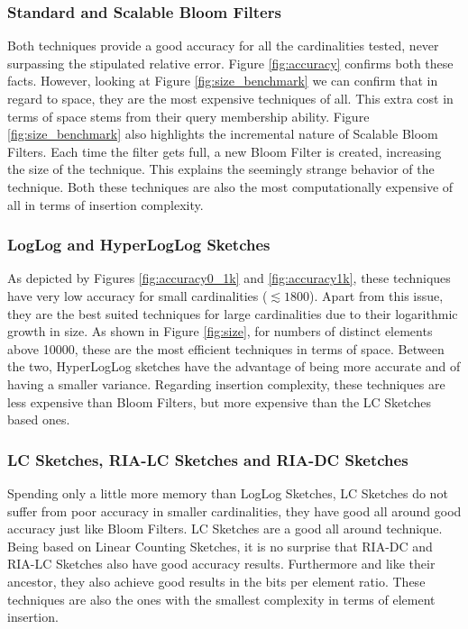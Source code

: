 \subsubsection{Standard and Scalable Bloom Filters} 
Both techniques provide a good accuracy for all the cardinalities
tested, never surpassing the stipulated relative error. Figure
\ref{fig:accuracy} confirms both these facts. However, looking at
Figure \ref{fig:size_benchmark} we can confirm that in regard to
space, they are the most expensive techniques of all. This extra cost
in terms of space stems from their query membership ability. Figure
\ref{fig:size_benchmark} also highlights the incremental nature of
Scalable Bloom Filters. Each time the filter gets full, a new Bloom
Filter is created, increasing the size of the technique. This explains
the seemingly strange behavior of the technique. Both these techniques
are also the most computationally expensive of all in terms of
insertion complexity.

\subsubsection{LogLog and HyperLogLog Sketches} 
As depicted by Figures \ref{fig:accuracy0_1k} and
\ref{fig:accuracy1k}, these techniques have very low accuracy for
small cardinalities ($\lesssim 1800$). Apart from this issue, they are
the best suited techniques for large cardinalities due to their
logarithmic growth in size. As shown in Figure \ref{fig:size}, for
numbers of distinct elements above 10000, these are the most efficient
techniques in terms of space. Between the two, HyperLogLog sketches have
the advantage of being more accurate and of having a smaller
variance. Regarding insertion complexity, these techniques are less
expensive than Bloom Filters, but more expensive than the LC Sketches
based ones.

\subsubsection{LC Sketches, RIA-LC Sketches and RIA-DC Sketches} 
Spending only a little more memory than LogLog Sketches, LC Sketches
do not suffer from poor accuracy in smaller cardinalities, they have
good all around good accuracy just like Bloom Filters. LC Sketches are
a good all around technique. Being based on Linear Counting Sketches,
it is no surprise that RIA-DC and RIA-LC Sketches also have good
accuracy results. Furthermore and like their ancestor, they also
achieve good results in the bits per element ratio. These techniques
are also the ones with the smallest complexity in
terms of element insertion. \\

